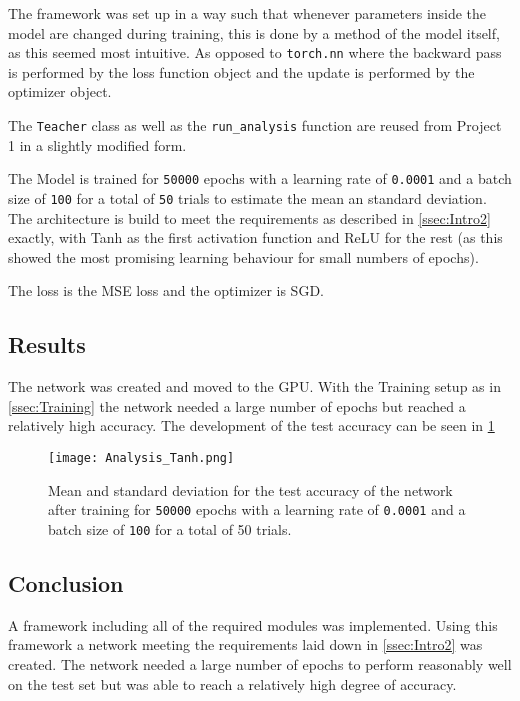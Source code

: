 \documentclass[11pt,english]{article}
\begin{document}
	The framework was set up in a way such that whenever parameters inside the model are changed during training, this is done by a method of the model itself, as this seemed most intuitive. As opposed to \lstinline|torch.nn| where the backward pass is performed by the loss function object and the update is performed by the optimizer object.
	
	The \lstinline|Teacher| class as well as the \lstinline|run_analysis| function are reused from Project 1 in a slightly modified form.
	
	The Model is trained for \lstinline|50000| epochs with a learning rate of \lstinline|0.0001| and a batch size of \lstinline|100| for a total of \lstinline|50| trials to estimate the mean an standard deviation. The architecture is build to meet the requirements as described in \cref{ssec:Intro2} exactly, with Tanh as the first activation function and ReLU for the rest (as this showed the most promising learning behaviour for small numbers of epochs).
	
	The loss is the MSE loss and the optimizer is SGD.
	
	\subsection{Results}
	
	The network was created and moved to the GPU. With the Training setup as in \cref{ssec:Training} the network needed a large number of epochs but reached a relatively high accuracy. The development of the test accuracy can be seen in \cref{fig:analysis_tanh}
	\begin{figure}[H]
		\centering
		\texttt{[image: Analysis\_Tanh.png]}
		\caption{Mean and standard deviation for the test accuracy of the network after training for \lstinline|50000| epochs with a learning rate of \lstinline|0.0001| and a batch size of \lstinline|100| for a total of 50 trials.}
		\label{fig:analysis_tanh}
	\end{figure} 
	
	\subsection{Conclusion}
	A framework including all of the required modules was implemented. Using this framework a network meeting the requirements laid down in \cref{ssec:Intro2} was created. The network needed a large number of epochs to perform reasonably well on the test set but was able to reach a relatively high degree of accuracy.
	
	
	\printbibliography
\end{document}
